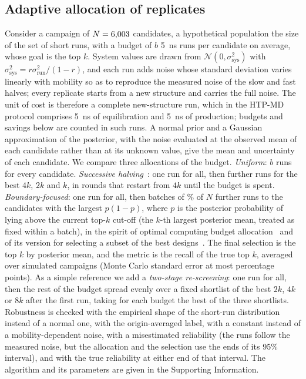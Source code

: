 \documentclass[journal=jcisd8,manuscript=article,email=true]{achemso}
\begin{document}
\subsection{Adaptive allocation of replicates}\label{sec:allocation-method}
Consider a campaign of $N=6{,}003$ candidates, a hypothetical population the size of the set of
short runs, with a budget of $b$ \SI{5}{\nano\second} runs per
candidate on average, whose goal is the top $k$. System values are drawn from
$\mathcal N(0,\sigma_{\mathrm{sys}}^2)$ with $\sigma_{\mathrm{sys}}^2=r\sigma_{\mathrm{run}}^2/(1-r)$,
and each run adds noise whose standard deviation varies linearly with mobility so as to reproduce
the measured noise of the slow and fast halves; every replicate starts from a new structure and
carries the full noise. The unit of cost is therefore a complete new-structure run, which in the
HTP-MD protocol comprises \SI{5}{\nano\second} of equilibration and \SI{5}{\nano\second} of
production; budgets and savings below are counted in such runs. A normal prior and a Gaussian approximation
of the posterior, with the noise evaluated at the observed mean of each candidate rather than at
its unknown value, give the mean and uncertainty of each candidate. We compare three allocations of the budget. \emph{Uniform}: $b$ runs for every
candidate. \emph{Successive halving}~\cite{Jamieson2016SuccessiveHalving}: one run for all, then
further runs for the best $4k$, $2k$ and $k$, in rounds that restart from $4k$ until the budget
is spent.
\emph{Boundary-focused}: one run for all, then batches of \alBatchPct\% of $N$ further runs to the
candidates with the largest $p(1-p)$, where $p$ is the posterior probability of lying above the
current top-$k$ cut-off (the $k$-th largest posterior mean, treated as fixed within a batch), in the spirit of optimal computing budget
allocation~\cite{Chen2000OCBA} and of its version for selecting a subset of the best
designs~\cite{Chen2008OCBAm}. The final selection is the top $k$ by posterior mean, and the
metric is the recall of the true top $k$, averaged over \alReps{} simulated campaigns (Monte
Carlo standard error at most \alMCErrMax{} percentage points). As a simple reference we add a
\emph{two-stage re-screening}: one run for all, then the rest of the budget spread evenly over a
fixed shortlist of the best $2k$, $4k$ or $8k$ after the first run, taking for each budget the best
of the three shortlists. Robustness is checked with the empirical shape of the short-run
distribution instead of a normal one, with the origin-averaged label, with a constant instead of
a mobility-dependent noise, with a misestimated reliability (the runs follow the measured noise,
but the allocation and the selection use the ends of its 95\% interval), and with the true
reliability at either end of that interval. The algorithm and its parameters are given in the
Supporting Information.
\end{document}
